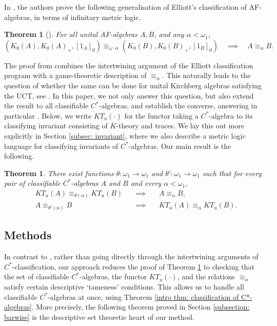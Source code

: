 \documentclass[12pt]{amsart}
\newtheorem{main}{Theorem}
\newtheorem{theorem}{Theorem}[section]
\begin{document}
In \cite{games_on_AF_algebras}, the authors prove the following generalisation of Elliott's classification of AF-algebras, in terms of infinitary metric logic.
\begin{theorem}[{\cite[Theorem A]{games_on_AF_algebras}}]
    For all unital AF-algebras $A, B$, and any $\alpha < \omega_1$,
    \[
        (K_0(A), K_0(A)_+, [1_A]_0) \equiv_{\omega \cdot \alpha} (K_0(B), K_0(B)_+, [1_B]_0) \quad \implies \quad  A \equiv_\alpha B.
    \]
\end{theorem}
The proof from \cite{games_on_AF_algebras} combines the intertwining argument of the Elliott classification program with a game-theoretic description of $\equiv_{\alpha}$. 
This naturally leads to the question of whether the same can be done for unital Kirchberg algebras satisfying the UCT, see \cite[Question 1.2]{games_on_AF_algebras}. 
In this paper, we not only answer this question, but also extend the result to all classifiable $C^*$-algebras, and establish the converse, answering in particular \cite[Question 4.5]{games_on_AF_algebras}.
Below, we write $KT_u(\cdot)$ for the functor taking a $C^*$-algebra to its classifying invariant consisting of $K$-theory and traces. We lay this out more explicitly in Section \ref{subsec: invariant}, where we also describe a metric logic language for classifying invariants of $C^*$-algebras. Our main result is the following.
\begin{main}\label{main1: classifiable}
    There exist functions $\theta \colon \omega_1 \rightarrow \omega_1$ and $\theta' \colon \omega_1 \rightarrow \omega_1$ such that for every pair of classifiable $C^*$-algebras $A$ and $B$ and every $\alpha < \omega_1$,
    \begin{align*}
        &KT_u(A) \equiv_{\theta(\alpha)} KT_u(B) \quad &\implies \quad &A \equiv_\alpha B,\\
        &A \equiv_{\theta'(\alpha)} B \quad &\implies \quad &KT_u(A) \equiv_\alpha KT_u(B).
    \end{align*}
        
\end{main}

\subsection{Methods}
In contrast to \cite{games_on_AF_algebras}, rather than going directly through the intertwining arguments of $C^*$-classification, our approach reduces the proof of Theorem \ref{main1: classifiable} to checking that the set of classifiable $C^*$-algebras, the functor $KT_u(\cdot)$, and the relations $\equiv_\alpha$ satisfy certain descriptive `tameness' conditions.
This allows us to handle all classifiable $C^*$-algebras at once, using Theorem \ref{intro thm: classification of C*-algebras}.
More precisely, the following theorem proved in Section \ref{subsection: barwise} is the descriptive set theoretic heart of our method.
\end{document}
